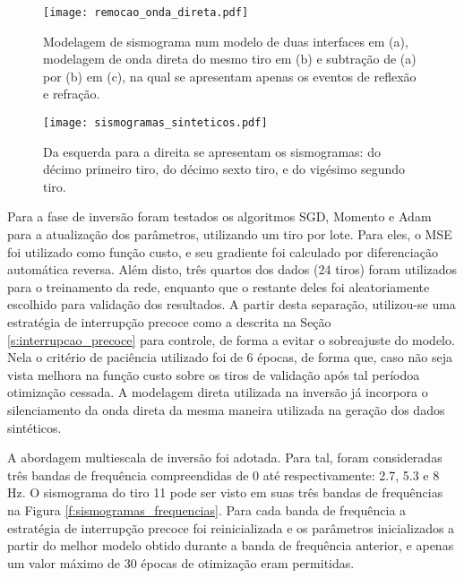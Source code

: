       \begin{figure}
        \begin{center}
          \texttt{[image: remocao\_onda\_direta.pdf]}
        \end{center}
        \caption{Modelagem de sismograma num modelo de duas interfaces em (a), modelagem de onda direta do mesmo tiro em (b) e subtração de (a) por (b) em (c), na qual se apresentam apenas os eventos de reflexão e refração.}
        \label{f:remocao_onda_direta}
      \end{figure}


      \begin{figure}
        \begin{center}
          \texttt{[image: sismogramas\_sinteticos.pdf]}
        \end{center}
        \caption{Da esquerda para a direita se apresentam os sismogramas: do décimo primeiro tiro, do décimo sexto tiro, e do vigésimo segundo tiro.}
        \label{f:sismogramas_sinteticos}
      \end{figure}

    Para a fase de inversão foram testados os algoritmos SGD, Momento e Adam para a atualização dos parâmetros, utilizando um tiro por lote. Para eles, o MSE foi utilizado como função custo, e seu gradiente foi calculado por diferenciação automática reversa. Além disto, três quartos dos dados (24 tiros) foram utilizados para o treinamento da rede, enquanto que o restante deles foi aleatoriamente escolhido para validação dos resultados. A partir desta separação, utilizou-se uma estratégia de interrupção precoce como a descrita na Seção \ref{s:interrupcao_precoce} para controle, de forma a evitar o sobreajuste do modelo. Nela o critério de paciência utilizado foi de 6 épocas, de forma que, caso não seja vista melhora na função custo sobre os tiros de validação após tal período\DIFaddbegin \DIFadd{, }\DIFaddend a otimização \DIFdelbegin {}\DIFdelend \DIFaddbegin {}\DIFaddend cessada. A modelagem direta utilizada na inversão já incorpora o silenciamento da onda direta da mesma maneira utilizada na geração dos dados sintéticos.

    A abordagem multiescala de inversão foi adotada. Para tal, foram consideradas três bandas de frequência compreendidas de 0 até respectivamente: 2.7, 5.3 e 8 Hz. O sismograma do tiro 11 pode ser visto em suas três bandas de frequências na Figura \ref{f:sismogramas_frequencias}. Para cada banda de frequência a estratégia de interrupção precoce foi reinicializada e os parâmetros inicializados a partir do melhor modelo obtido durante a banda de frequência anterior, e apenas um valor máximo de 30 épocas de otimização eram permitidas.

